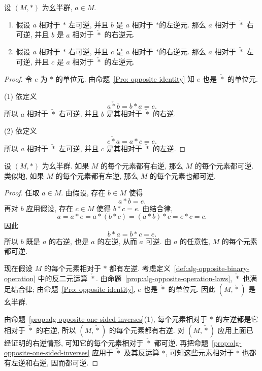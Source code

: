 \documentclass[usesamecnt, thmcnt=section, lang=cn, newtx, 10pt, scheme=chinese]{elegantbook}
\begin{document}
\begin{proposition}\label{prop:alg-opposite-one-sided-inverses}
设 $(M,*)$ 为幺半群, $a\in M$. 
\begin{enumerate}[label=\rm(\arabic*)]
\item 假设 $a$ 相对于 $*$ 左可逆, 并且 $b$ 是 $a$ 相对于 $*$的左逆元. 那么 $a$ 相对于 $\mathbin{\check{*}}$ 右可逆, 并且 $b$ 是 $a$ 相对于 $\mathbin{\check{*}}$ 的右逆元.

\item 假设 $a$ 相对于 $*$ 右可逆, 并且 $c$ 是 $a$ 相对于 $*$的右逆元. 那么 $a$ 相对于 $\mathbin{\check{*}}$ 左可逆, 并且 $c$ 是 $a$ 相对于 $\mathbin{\check{*}}$ 的左逆元.
\end{enumerate} 
\end{proposition}
\begin{proof}
令 $e$ 为 $*$ 的单位元. 由命题~\ref{Pro: opposite identity} 知 $e$ 也是 $\mathbin{\check{*}}$ 的单位元.

(1) 依定义 \[a\mathbin{\check{*}}b=b*a=e.\]
所以 $a$ 相对于 $\mathbin{\check{*}}$ 右可逆, 并且 $b$ 是其相对于 $\mathbin{\check{*}}$ 的右逆. 

(2) 依定义
\[
 c\mathbin{\check{*}}a=a*c=e.
\]
所以 $a$ 相对于 $\mathbin{\check{*}}$ 左可逆, 并且 $c$ 是其相对于 $\mathbin{\check{*}}$ 的左逆.
\end{proof}

\begin{proposition}\label{prop:alg-one-sided-invertible-monoid-group}
设 $(M,*)$ 为幺半群. 如果 $M$ 的每个元素都有右逆, 那么 $M$ 的每个元素都可逆. 类似地, 如果 $M$ 的每个元素都有左逆, 那么 $M$ 的每个元素也都可逆.
\end{proposition}

\begin{proof}
任取 $a\in M$. 由假设, 存在 $b\in M$ 使得
\[
 a*b=e.
\]
再对 $b$ 应用假设, 存在 $c\in M$ 使得 $b*c=e$. 由结合律,
\[
 a=a*e=a*(b*c)=(a*b)*c=e*c=c.
\]
因此
\[
 b*a=b*c=e.
\]
所以 $b$ 既是 $a$ 的右逆, 也是 $a$ 的左逆, 从而 $a$ 可逆. 由 $a$ 的任意性, $M$ 的每个元素都可逆.

现在假设 $M$ 的每个元素相对于 $*$ 都有左逆. 考虑定义~\ref{def:alg-opposite-binary-operation} 中的反二元运算 $\check{*}$. 由命题~\ref{prop:alg-opposite-operation-laws}, $\check{*}$ 也满足结合律; 由命题~\ref{Pro: opposite identity}, $e$ 也是 $\check{*}$ 的单位元. 因此 $(M,\check{*})$ 是幺半群.

由命题~\ref{prop:alg-opposite-one-sided-inverses}(1), 每个元素相对于 $*$ 的左逆都是它相对于 $\check{*}$ 的右逆, 所以 $(M,\check{*})$ 的每个元素都有右逆. 对 $(M,\check{*})$ 应用上面已经证明的右逆情形, 可知它的每个元素相对于 $\check{*}$ 都可逆. 再把命题~\ref{prop:alg-opposite-one-sided-inverses} 应用于 $\check{*}$ 及其反运算 $*$, 可知这些元素相对于 $*$ 也都有左逆和右逆, 因而都可逆.
\end{proof}
\end{document}
